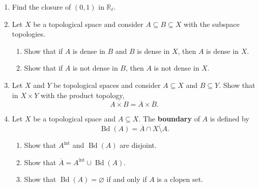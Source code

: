 \documentclass[12pt]{article}
\newcommand{\R}{\mathbb{R}}
\DeclareMathOperator{\bd}{Bd}
\newcommand{\inte}{^{\text{int}}}
\begin{document}
\begin{enumerate}[roomy]


\item Find the closure of $(0,1)$ in $\R_{\ell}$.


\item Let $X$ be a topological space and consider $A \subseteq B \subseteq X$ with the subspace topologies.

\begin{enumerate}
	\item Show that if $A$ is dense in $B$ and $B$ is dense in $X$, then $A$ is dense in $X$.

\item Show that if $A$ is not dense in $B$, then $A$ is not dense in $X$.
\end{enumerate}


\item Let $X$ and $Y$ be topological spaces and consider $A \subseteq X$ and $B \subseteq Y$.
Show that in $X \times Y$ with the product topology,
\[ \overline{A \times B} = \overline{A} \times \overline{B}.\]



\item Let $X$ be a topological space and $A \subseteq X$. The {\bf boundary} of $A$ is defined by
\[ \bd(A) = \overline{A} \cap \overline{X \setminus A}.\]

\begin{enumerate}

\item Show that $A\inte$ and $\bd(A)$ are disjoint.

\item Show that $\overline{A} = A\inte \cup \bd(A)$.

\item Show that $\bd(A) = \varnothing$ if and only if $A$ is a clopen set.
\end{enumerate}


\end{enumerate}
\end{document}
